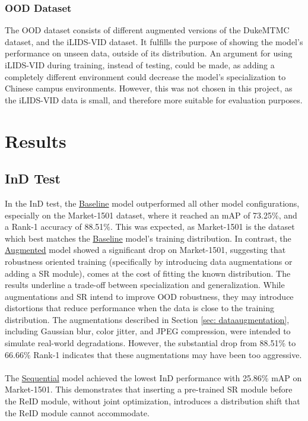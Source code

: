 \subsubsection{OOD Dataset}
The \acs{OOD} dataset consists of different augmented versions of the \acs{DukeMTMC} dataset, and the \acs{iLIDS-VID} dataset. It fulfills the purpose of showing the model's performance on unseen data, outside of its distribution. An argument for using \acs{iLIDS-VID} during training, instead of testing, could be made, as adding a completely different environment could decrease the model's specialization to Chinese campus environments. However, this was not chosen in this project, as the \acs{iLIDS-VID} data is small, and therefore more suitable for evaluation purposes.  


\section{Results}

\subsection{\acs{InD} Test}

In the \acs{InD} test, the \hyperlink{model:baseline}{Baseline} model outperformed all other model configurations, especially on the Market-1501 dataset, where it reached an mAP of 73.25\%, and a Rank-1 accuracy of 88.51\%. This was expected, as Market-1501 is the dataset which best matches the \hyperlink{model:baseline}{Baseline} model's training distribution. In contrast, the \hyperlink{model:augmented}{Augmented} model showed a significant drop on Market-1501, suggesting that robustness oriented training (specifically by introducing data augmentations or adding a \acs{SR} module), comes at the cost of fitting the known distribution. The results underline a trade-off between specialization and generalization. While augmentations and \acs{SR} intend to improve \acs{OOD} robustness, they may introduce distortions that reduce performance when the data is close to the training distribution. The augmentations described in Section \ref{sec: dataaugmentation}, including Gaussian blur, color jitter, and JPEG compression, were intended to simulate real-world degradations. However, the substantial drop from 88.51\% to 66.66\% Rank-1 indicates that these augmentations may have been too aggressive.
\\\\
The \hyperlink{model:sequential}{Sequential} model achieved the lowest \acs{InD} performance with 25.86\% \acs{mAP} on Market-1501. This demonstrates that inserting a pre-trained \acs{SR} module before the \acs{ReID} module, without joint optimization, introduces a distribution shift that the \acs{ReID} module cannot accommodate.

